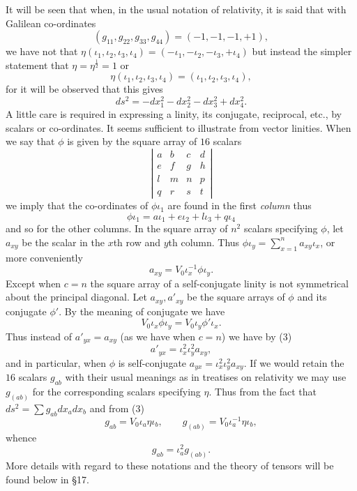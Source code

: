 \documentclass[11pt]{article}
\begin{document}
It will be seen that when, in the usual notation of relativity, it is said that with Galilean co-ordinates
\[
(g_{11},g_{22},g_{33},g_{44})=(-1,-1,-1,+1),
\]
we have not that $\eta(\iota_1,\iota_2,\iota_3,\iota_4)=(-\iota_1,-\iota_2,-\iota_3,+\iota_4)$ but instead the simpler statement that $\eta=\eta^{\frac12}=1$ or
\[
\eta(\iota_1,\iota_2,\iota_3,\iota_4)=(\iota_1,\iota_2,\iota_3,\iota_4),
\]
for it will be observed that this gives
\[
ds^2=-dx_1^2-dx_2^2-dx_3^2+dx_4^2.
\]
\indent A little care is required in expressing a linity, its conjugate, reciprocal, etc., by scalars or co-ordinates. It seems sufficient to illustrate from vector linities. When we say that $\phi$ is given by the square array of $16$ scalars
\[
\left|\begin{array}{cccc}a&b&c&d\\e&f&g&h\\l&m&n&p\\q&r&s&t\end{array}\right|
\]
we imply that the co-ordinates of $\phi\iota_1$ are found in the first \emph{column} thus
\[
\phi\iota_1=a\iota_1+e\iota_2+l\iota_3+q\iota_4
\]
and so for the other columns. In the square array of $n^2$ scalars specifying $\phi$, let $a_{xy}$ be the scalar in the $x$th row and $y$th column. Thus $\phi\iota_y=\sum_{x=1}^n a_{xy}\iota_x$, or more conveniently
\begin{equation}a_{xy}=V_0\iota_x^{-1}\phi\iota_y.\tag{3}\end{equation}
Except when $c=n$ the square array of a self-conjugate linity is not symmetrical about the principal diagonal. Let $a_{xy},a'_{xy}$ be the square arrays of $\phi$ and its conjugate $\phi'$. By the meaning of conjugate we have
\[
V_0\iota_x\phi\iota_y=V_0\iota_y\phi'\iota_x.
\]
Thus instead of $a'_{yx}=a_{xy}$ (as we have when $c=n$) we have by (3)
\begin{equation}a'_{yx}=\iota_x^2\iota_y^2a_{xy},\tag{4}\end{equation}
and in particular, when $\phi$ is self-conjugate $a_{yx}=\iota_x^2\iota_y^2a_{xy}$. If we would retain the $16$ scalars $g_{ab}$ with their usual meanings as in treatises on relativity we may use $g_{(ab)}$ for the corresponding scalars specifying $\eta$. Thus from the fact that $ds^2=\sum g_{ab}dx_adx_b$ and from (3)
\[
g_{ab}=V_0\iota_a\eta\iota_b,\qquad g_{(ab)}=V_0\iota_a^{-1}\eta\iota_b,
\]
whence
\begin{equation}g_{ab}=\iota_a^2g_{(ab)}.\tag{5}\end{equation}
More details with regard to these notations and the theory of tensors will be found below in §17.
\end{document}
